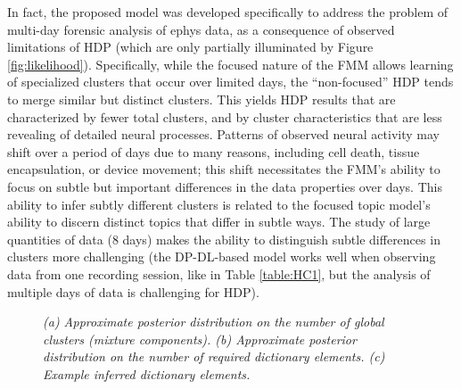 \documentclass[journal]{IEEEtran}
\begin{document}
In fact, the proposed model was developed specifically to address the problem of multi-day forensic analysis of ephys data, as a consequence of observed limitations of HDP (which are only partially illuminated by Figure \ref{fig:likelihood}). Specifically, while the focused nature of the FMM allows learning of specialized clusters that occur over limited days, the ``non-focused'' HDP tends to merge similar but distinct clusters. This yields HDP results that are characterized by fewer total clusters, and by cluster characteristics that are less revealing of detailed neural processes. Patterns of observed neural activity may shift over a period of days due to many reasons, including cell death, tissue encapsulation, or device movement; this shift necessitates the FMM's ability to focus on subtle but important differences in the data properties over days. This ability to infer subtly different clusters is related to the focused topic model's ability  \cite{compound} to discern distinct topics that differ in subtle ways. The study of large quantities of data (8 days) makes the ability to distinguish subtle differences in clusters more challenging (the DP-DL-based model works well when observing data from one recording session, like in Table \ref{table:HC1}, but the analysis of multiple days of data is challenging for HDP).



%



\begin{figure}[!htbp]
\centering

 \hspace{-3mm}
  \caption{\small \emph{(a) Approximate posterior distribution on the number of global clusters
(mixture components). (b) Approximate posterior distribution on the
number of required dictionary elements. (c) Example inferred
dictionary elements.}}
\end{figure}
\end{document}
